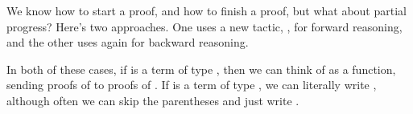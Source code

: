 \documentclass[letterpaper,10pt,english]{sphinxmanual}
\begin{document}
\begin{sphinxVerbatim}[commandchars=\\\{\}]
          

         

          

             
\end{sphinxVerbatim}

\sphinxAtStartPar
We know how to start a proof, and how to finish a proof, but what about partial progress?
Here’s two approaches.
One uses a new tactic, , for forward reasoning,
and the other uses  again for backward reasoning.

\sphinxAtStartPar
In both of these cases, if  is a term of type , then we can think of  as a function,
sending proofs of  to proofs of .
If  is a term of type , we can literally write , although often we can skip the parentheses and just write .
\end{document}
